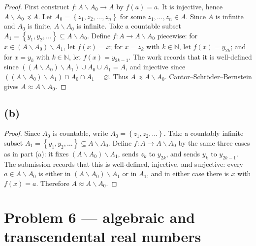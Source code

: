 \begin{proof}

First construct \(f:A \smallsetminus A_{0}\rightarrow A\) by \(f(a) = a\). It is injective, hence \(A \smallsetminus A_{0} \preceq A\). Let \(A_{0} = \left\{ {z_{1},z_{2},\ldots,z_{n}} \right\}\) for some \(z_{1},\ldots,z_{n} \in A\). Since \(A\) is infinite and \(A_{0}\) is finite, \(A \smallsetminus A_{0}\) is infinite. Take a countable subset \(A_{1} = \left\{ {y_{1},y_{2},\ldots} \right\} \subseteq A \smallsetminus A_{0}\). Define \(f:A\rightarrow A \smallsetminus A_{0}\) piecewise: for \(x \in \left( {A \smallsetminus A_{0}} \right) \smallsetminus A_{1}\), let \(f(x) = x\); for \(x = z_{k}\) with \(k \in \mathbb{N}\), let \(f(x) = y_{2k}\); and for \(x = y_{k}\) with \(k \in \mathbb{N}\), let \(f(x) = y_{2k - 1}\). The work records that it is well-defined since \(\left( {\left( {A \smallsetminus A_{0}} \right) \smallsetminus A_{1}} \right) \cup A_{0} \cup A_{1} = A\), and injective since \(\left( {\left( {A \smallsetminus A_{0}} \right) \smallsetminus A_{1}} \right) \cap A_{0} \cap A_{1} = \varnothing\). Thus \(A \preceq A \smallsetminus A_{0}\). Cantor--Schröder--Bernstein gives \(A \approx A \smallsetminus A_{0}\).

\end{proof}

\subsection{(b)}

\begin{proof}

Since \(A_{0}\) is countable, write \(A_{0} = \left\{ {z_{1},z_{2},\ldots} \right\}\). Take a countably infinite subset \(A_{1} = \left\{ {y_{1},y_{2},\ldots} \right\} \subseteq A \smallsetminus A_{0}\). Define \(f:A\rightarrow A \smallsetminus A_{0}\) by the same three cases as in part (a): it fixes \(\left( {A \smallsetminus A_{0}} \right) \smallsetminus A_{1}\), sends \(z_{k}\) to \(y_{2k}\), and sends \(y_{k}\) to \(y_{2k - 1}\). The submission records that this is well-defined, injective, and surjective: every \(a \in A \smallsetminus A_{0}\) is either in \(\left( {A \smallsetminus A_{0}} \right) \smallsetminus A_{1}\) or in \(A_{1}\), and in either case there is \(x\) with \(f(x) = a\). Therefore \(A \approx A \smallsetminus A_{0}\).

\end{proof}

\section{Problem 6 --- algebraic and transcendental real numbers}

